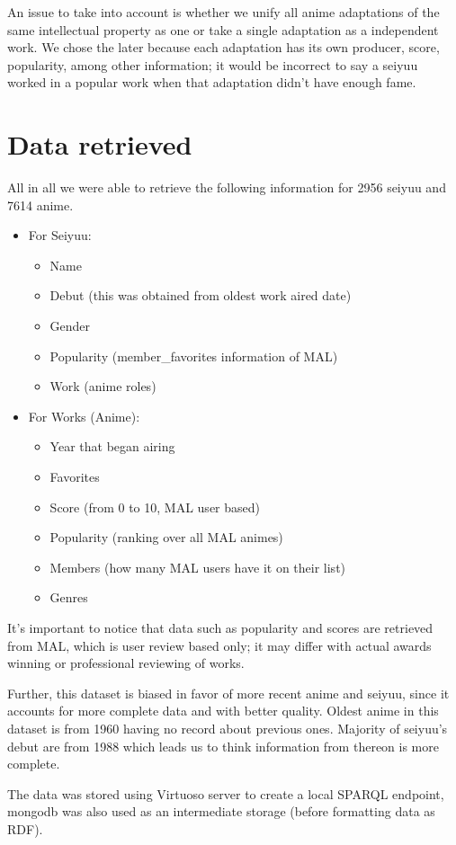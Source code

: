 An issue to take into account is whether we unify all anime adaptations of the same intellectual property as one or take a single adaptation as a independent work. We chose the later because each adaptation has its own producer, score, popularity, among other information; it would be incorrect to say a seiyuu worked in a popular work when that adaptation didn't have enough fame.\\

\section{Data retrieved}
All in all we were able to retrieve the following information for 2956 seiyuu and 7614 anime.

\begin{itemize}
	\item For Seiyuu:
	\begin{itemize}
		\item Name
		\item Debut (this was obtained from oldest work aired date)
		\item Gender
		\item Popularity (member\_favorites information of MAL)
		\item Work (anime roles)
	\end{itemize}
	\item For Works (Anime):
	\begin{itemize}
		\item Year that began airing
		\item Favorites
		\item Score (from 0 to 10, MAL user based)
		\item Popularity (ranking over all MAL animes)
		\item Members (how many MAL users have it on their list)
		\item Genres
	\end{itemize}
\end{itemize}

It's important to notice that data such as popularity and scores are retrieved from MAL, which is user review based only; it may differ with actual awards winning or professional reviewing of works.

Further, this dataset is biased in favor of more recent anime and seiyuu, since it accounts for more complete data and with better quality. Oldest anime in this dataset is from 1960 having no record about previous ones. Majority of seiyuu's debut are from 1988 which leads us to think information from thereon is more complete. 

The data was stored using Virtuoso server to create a local SPARQL endpoint, mongodb was also used as an intermediate storage (before formatting data as RDF).











